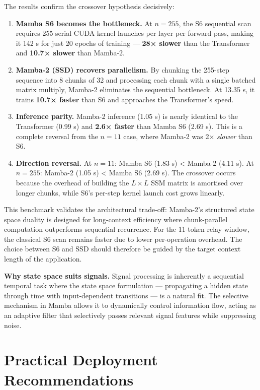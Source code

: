 \documentclass[
  english,
  12pt,
  12pt,
  a4paper,
  oneside]{report}
\begin{document}
The results confirm the crossover hypothesis decisively:

\begin{enumerate}
\def\labelenumi{\arabic{enumi}.}
\item
  \textbf{Mamba S6 becomes the bottleneck.} At \(n = 255\), the S6 sequential scan requires 255 serial CUDA kernel launches per layer per forward pass, making it 142 s for just 20 epochs of training --- \textbf{28× slower} than the Transformer and \textbf{10.7× slower} than Mamba-2.
\item
  \textbf{Mamba-2 (SSD) recovers parallelism.} By chunking the 255-step sequence into 8 chunks of 32 and processing each chunk with a single batched matrix multiply, Mamba-2 eliminates the sequential bottleneck. At 13.35 s, it trains \textbf{10.7× faster} than S6 and approaches the Transformer's speed.
\item
  \textbf{Inference parity.} Mamba-2 inference (1.05 s) is nearly identical to the Transformer (0.99 s) and \textbf{2.6× faster} than Mamba S6 (2.69 s). This is a complete reversal from the \(n = 11\) case, where Mamba-2 was 2× \emph{slower} than S6.
\item
  \textbf{Direction reversal.} At \(n = 11\): Mamba S6 (1.83 s) \textless{} Mamba-2 (4.11 s). At \(n = 255\): Mamba-2 (1.05 s) \textless{} Mamba S6 (2.69 s). The crossover occurs because the overhead of building the \(L \times L\) SSM matrix is amortised over longer chunks, while S6's per-step kernel launch cost grows linearly.
\end{enumerate}

This benchmark validates the architectural trade-off: Mamba-2's structured state space duality is designed for long-context efficiency where chunk-parallel computation outperforms sequential recurrence. For the 11-token relay window, the classical S6 scan remains faster due to lower per-operation overhead. The choice between S6 and SSD should therefore be guided by the target context length of the application.

\textbf{Why state space suits signals.} Signal processing is inherently a sequential temporal task where the state space formulation --- propagating a hidden state through time with input-dependent transitions --- is a natural fit. The selective mechanism in Mamba allows it to dynamically control information flow, acting as an adaptive filter that selectively passes relevant signal features while suppressing noise.

\section{Practical Deployment Recommendations}\label{sec:practical-deployment-recommendations}
\end{document}
